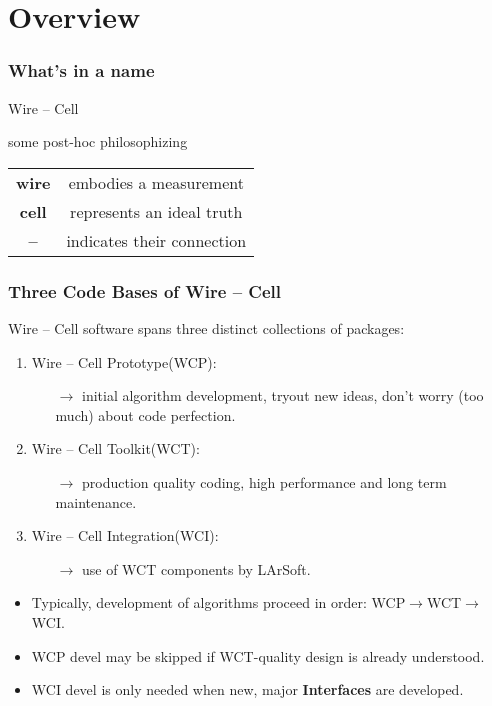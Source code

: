 \documentclass[xcolor=dvipsnames]{beamer}
\def\wc{Wire -- Cell\xspace}
\def\wcp{Wire -- Cell Prototype\xspace}
\def\wct{Wire -- Cell Toolkit\xspace}
\def\wci{Wire -- Cell Integration\xspace}
\def\ls{LArSoft\xspace}
\begin{document}



\section{Overview}


\begin{frame}
  \frametitle{What's in a name}
  \begin{center}
    {\Huge \wc}

    \vfill

    some post-hoc philosophizing

    \vfill

    \begin{tabular}[h]{cc}
      \textbf{wire} & embodies a measurement \\ 
      \textbf{cell} & represents an ideal truth \\
      \textbf{--} & indicates their connection \\
    \end{tabular}
  \end{center}
\end{frame}

\begin{frame}
  \frametitle{Three Code Bases of \wc}

  \wc software spans three distinct collections of packages:

  \begin{enumerate}
  \item \wcp (WCP):
    \begin{itemize}
    \item[$\to$] initial algorithm development, tryout new ideas,
      don't worry (too much) about code perfection.
    \end{itemize}
  \item \wct (WCT):
    \begin{itemize}
    \item[$\to$] production quality coding, high performance and long
      term maintenance.
    \end{itemize}
  \item \wci (WCI):
    \begin{itemize}
    \item[$\to$] use of WCT components by \ls.
    \end{itemize}
  \end{enumerate}

  \footnotesize
  \begin{itemize}
  \item Typically, development of algorithms proceed in order: WCP$\to$WCT$\to$WCI.
  \item WCP devel may be skipped if WCT-quality design is already understood.
  \item WCI devel is only needed when new, major \textbf{Interfaces} are developed.
  \end{itemize}

\end{frame}
\end{document}
